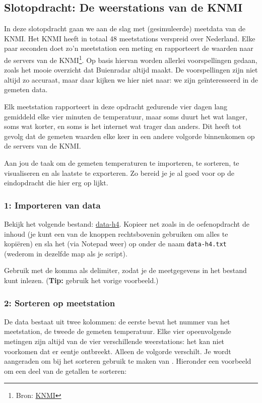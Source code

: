 \documentclass[a4paper,11pt, fleqn]{article}
\begin{document}
\subsection{Slotopdracht: De weerstations van de KNMI}
In deze slotopdracht gaan we aan de slag met (gesimuleerde) meetdata van de KNMI. Het KNMI heeft in totaal 48 meetstations verspreid over Nederland. Elke paar seconden doet zo'n meetstation een meting en rapporteert de waarden naar de servers van de KNMI\footnote{Bron: \href{https://www.knmi.nl/kennis-en-datacentrum/uitleg/automatische-weerstations}{KNMI}}. Op basis hiervan worden allerlei voorspellingen gedaan, zoals het mooie overzicht dat Buienradar altijd maakt. De voorspellingen zijn niet altijd zo accuraat, maar daar kijken we hier niet naar: we zijn ge\"interesseerd in de gemeten data.

Elk meetstation rapporteert in deze opdracht gedurende vier dagen lang gemiddeld elke vier minuten de temperatuur, maar soms duurt het wat langer, soms wat korter, en soms is het internet wat trager dan anders. Dit heeft tot gevolg dat de gemeten waarden elke keer in een andere volgorde binnenkomen op de servers van de KNMI.

Aan jou de taak om de gemeten temperaturen te importeren, te sorteren, te visualiseren en als laatste te exporteren. Zo bereid je je al goed voor op de eindopdracht die hier erg op lijkt.

\subsubsection*{1: Importeren van data}
Bekijk het volgende bestand:
\href{https://github.com/Ichthus-College-IN/Python-x-Meet-je-leefomgeving/tree/main/inc/data_h4.txt}{data-h4}. Kopieer net zoals in de oefenopdracht de inhoud (je kunt een van de knoppen rechtsbovenin gebruiken om alles te kopi\"eren) en sla het (via Notepad weer) op onder de naam \verb,data-h4.txt, (wederom in dezelfde map als je script).

Gebruik  met de komma als delimiter, zodat je de meetgegevens in het bestand kunt inlezen. ({\bf Tip:} gebruik het vorige voorbeeld.)

\subsubsection*{2: Sorteren op meetstation}
De data bestaat uit twee kolommen: de eerste bevat het nummer van het meetstation, de tweede de gemeten temperatuur. Elke vier opeenvolgende metingen zijn altijd van de vier verschillende weerstations: het kan niet voorkomen dat er eentje ontbreekt. Alleen de volgorde verschilt. Je wordt aangeraden om bij het sorteren gebruik te maken van . Hieronder een voorbeeld om een deel van de getallen te sorteren:
\end{document}
